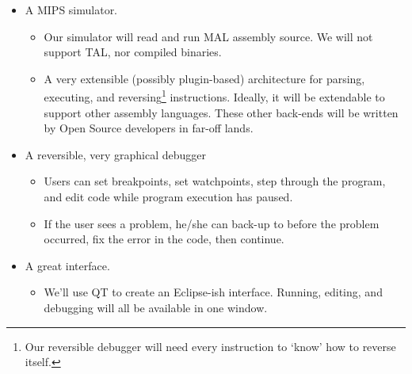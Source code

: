 \begin{itemize}
\item A MIPS simulator.
	\begin{itemize}
	\item Our simulator will read and run MAL assembly source. We will not support TAL, nor compiled binaries.
	\item A very extensible (possibly plugin-based) architecture for parsing, executing, and reversing\footnote{Our reversible debugger will need every instruction to `know' how to reverse itself.} instructions. Ideally, it will be extendable to support other assembly languages. These other back-ends will be written by Open Source developers in far-off lands.
	\end{itemize}
\item A reversible, very graphical debugger
	\begin{itemize}
	\item Users can set breakpoints, set watchpoints, step through the program, and edit code while program execution has paused.
	\item If the user sees a problem, he/she can back-up to before the problem occurred, fix the error in the code, then continue.
	\end{itemize}
\item A great interface.
	\begin{itemize}
	\item We'll use QT to create an Eclipse-ish interface. Running, editing, and debugging will all be available in one window.
	\end{itemize}
\end{itemize}






